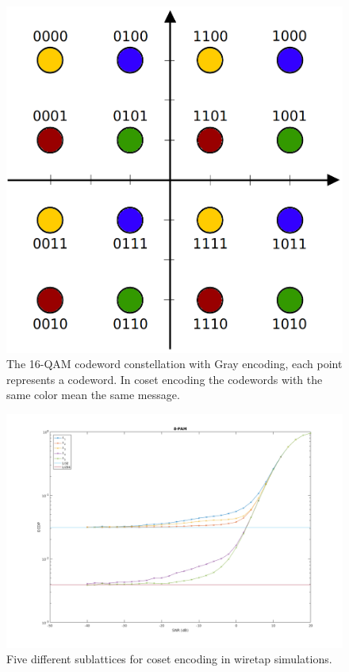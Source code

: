 \documentclass[english,12pt,a4paper,pdftex,sci,utf8]{aaltothesis}
\begin{document}
\par 
\begin{figure}[ht]
  \centering
  \includegraphics[width=0.5\linewidth]{16-QAM}
  \caption{The 16-QAM codeword constellation with Gray encoding, each point represents a codeword. In coset encoding the codewords with the same color mean the same message.}
  \label{fig:16QAM}
\end{figure}

\begin{figure}[ht]
  \centering
  \includegraphics[width=\linewidth]{alamouti_cosets12345_8-PAM}
  \caption{Five different sublattices for coset encoding in wiretap simulations.}
  \label{fig:ecdp}
\end{figure}
\end{document}
